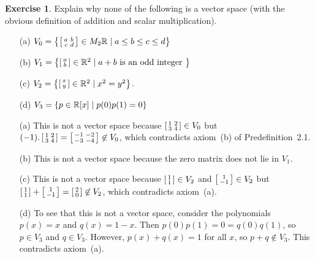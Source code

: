 \documentclass[a4paper]{amsart}
\theoremstyle{definition}
\newtheorem{exercise}{Exercise}
\newenvironment{solution}{{\noindent \bf Solution:}}{}
\begin{document}
\begin{exercise}\label{ex-not-vector-spaces}
 Explain why none of the following is a vector space (with
 the obvious definition of addition and scalar
 multiplication). 
 \begin{itemize}
  \item[(a)] $V_0=\left\{\left[\begin{smallmatrix} a&b\\ c&d\end{smallmatrix}\right]\in M_2{\mathbb{R}}\;|\; a\leq b\leq
    c\leq d\right\}$
  \item[(b)] $V_1=\left\{\left[\begin{smallmatrix} a\\ b\end{smallmatrix}\right]\in{\mathbb{R}}^2\;|\;
                         a+b\text{ is an odd integer } \right\}$
  \item[(c)] $V_2=\left\{\left[\begin{smallmatrix} x\\ y\end{smallmatrix}\right]\in{\mathbb{R}}^2 \;|\; x^2=y^2\right\}$.
  \item[(d)] $V_3=\{p\in{\mathbb{R}}[x]\;|\; p(0)p(1)=0\}$
 \end{itemize}
\end{exercise}
\begin{solution}
 \begin{itemize}
 \item[(a)] This is not a vector space because
  $\left[\begin{smallmatrix} 1&2\\3&4\end{smallmatrix}\right]\in V_0$ but 
  $(-1).\left[\begin{smallmatrix} 1&2\\3&4\end{smallmatrix}\right]=\left[\begin{smallmatrix} -1&-2\\-3&-4\end{smallmatrix}\right]\not\in V_0$,
  which contradicts axiom~(b) of Predefinition~2.1.
 \item[(b)] This is not a vector space because the zero matrix does
  not lie in $V_1$.
 \item[(c)] This is not a vector space because
  $\left[\begin{smallmatrix} 1\\1\end{smallmatrix}\right]\in V_2$ and $\left[\begin{smallmatrix} 1\\-1\end{smallmatrix}\right]\in V_2$
  but $\left[\begin{smallmatrix} 1\\1\end{smallmatrix}\right]+\left[\begin{smallmatrix} 1\\-1\end{smallmatrix}\right]=\left[\begin{smallmatrix} 2\\0\end{smallmatrix}\right]\not\in V_2$,
  which contradicts axiom~(a).
 \item[(d)] To see that this is not a vector space, consider
  the polynomials $p(x)=x$ and $q(x)=1-x$.  Then
  $p(0)p(1)=0=q(0)q(1)$, so $p\in V_3$ and $q\in V_3$.
  However, $p(x)+q(x)=1$ for all $x$, so $p+q\not\in V_3$.
  This contradicts axiom~(a).
 \end{itemize}
\end{solution}
\end{document}

